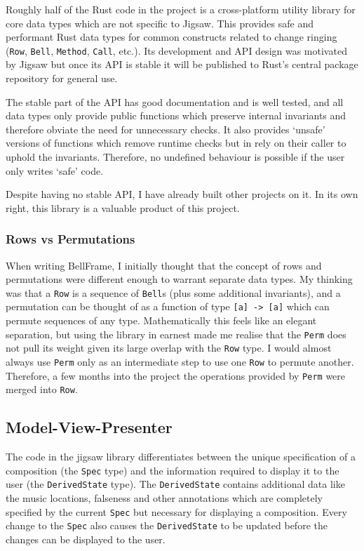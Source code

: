 \documentclass[12pt]{article}
\begin{document}
Roughly half of the Rust code in the project is a cross-platform utility library for core data types
which are not specific to Jigsaw.  This provides safe and performant Rust data types for common
constructs related to change ringing (\verb|Row|, \verb|Bell|, \verb|Method|, \verb|Call|, etc.).
Its development and API design was motivated by Jigsaw but once its API is stable it will be
published to Rust's central package repository for general use.

The stable part of the API has good documentation and is well tested, and all data types only
provide public functions which preserve internal invariants and therefore obviate the need for
unnecessary checks.  It also provides `unsafe' versions of functions which remove runtime checks but
in rely on their caller to uphold the invariants.  Therefore, no undefined behaviour is possible if
the user only writes `safe' code.

Despite having no stable API, I have already built other projects on it.  In its own right, this
library is a valuable product of this project.

\subsubsection{Rows vs Permutations}

When writing BellFrame, I initially thought that the concept of rows and permutations were different
enough to warrant separate data types.  My thinking was that a \verb|Row| is a sequence of
\verb|Bell|s (plus some additional invariants), and a permutation can be thought of as a function of
type \verb|[a] -> [a]| which can permute sequences of any type.  Mathematically this feels like an
elegant separation, but using the library in earnest made me realise that the \verb|Perm| does not
pull its weight given its large overlap with the \verb|Row| type.  I would almost always use
\verb|Perm| only as an intermediate step to use one \verb|Row| to permute another.  Therefore, a few
months into the project the operations provided by \verb|Perm| were merged into \verb|Row|.

\subsection{Model-View-Presenter}

The code in the jigsaw library differentiates between the unique specification of a composition
(the \verb|Spec| type) and the information required to display it to the user (the
\verb|DerivedState| type).  The \verb|DerivedState| contains additional data like the music
locations, falseness and other annotations which are completely specified by the current
\verb|Spec| but necessary for displaying a composition.  Every change to the \verb|Spec| also causes
the \verb|DerivedState| to be updated before the changes can be displayed to the user.
\end{document}
